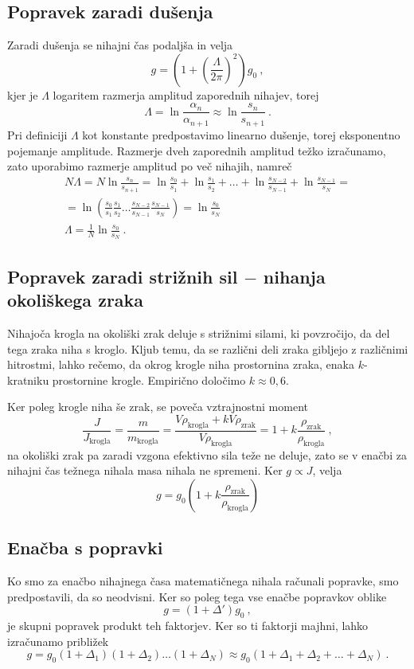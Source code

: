 \documentclass[12pt,a4paper]{article}
\begin{document}
\subsection{Popravek zaradi dušenja}
Zaradi dušenja se nihajni čas podaljša in velja
$$ g = \left( 1 + \left( \frac{\Lambda}{2\pi} \right)^2 \right) g_{0} \>, $$
kjer je $\Lambda$ logaritem razmerja amplitud zaporednih nihajev, torej
$$ \Lambda = \ln \frac{\alpha_n}{\alpha_{n+1}} \approx \ln \frac{s_n}{s_{n+1}} \>. $$
Pri definiciji $\Lambda$ kot konstante predpostavimo linearno dušenje, torej eksponentno pojemanje amplitude. Razmerje dveh zaporednih amplitud težko izračunamo, zato uporabimo razmerje amplitud po več nihajih, namreč
\begin{gather*}
  N\Lambda = N \ln \frac{s_n}{s_{n+1}} = \ln \frac{s_{0}}{s_{1}} + \ln \frac{s_{1}}{s_{2}} + \dots + \ln \frac{s_{N-2}}{s_{N-1}} + \ln \frac{s_{N-1}}{s_{N}} = \\
  = \ln \left( \frac{s_{0}}{s_{1}} \frac{s_{1}}{s_{2}} \dots \frac{s_{N-2}}{s_{N-1}} \frac{s_{N-1}}{s_{N}} \right) = \ln \frac{s_{0}}{s_{N}} \\
  \Lambda = \frac{1}{N} \ln \frac{s_{0}}{s_{N}} \>.
\end{gather*}

\subsection{Popravek zaradi strižnih sil $-$ nihanja okoliškega zraka}
Nihajoča krogla na okoliški zrak deluje s strižnimi silami, ki povzročijo, da del tega zraka niha s kroglo. Kljub temu, da se različni deli zraka gibljejo z različnimi hitrostmi, lahko rečemo, da okrog krogle niha prostornina zraka, enaka $k$-kratniku prostornine krogle. Empirično določimo $k \approx 0,6$.

Ker poleg krogle niha še zrak, se poveča vztrajnostni moment
$$ \frac{J}{J_{\textrm{krogla}}} = \frac{m}{m_{\textrm{krogla}}} = \frac{V\rho_\textrm{krogla} + kV \rho_{\textrm{zrak}}}{V\rho_\textrm{krogla}} = 1 + k \frac{\rho_{\textrm{zrak}}}{\rho_{\textrm{krogla}}} \>, $$
na okoliški zrak pa zaradi vzgona efektivno sila teže ne deluje, zato se v enačbi za nihajni čas težnega nihala masa nihala ne spremeni. Ker $g \propto J$, velja
$$ g = g_{0} \left( 1 + k \frac{\rho_{\textrm{zrak}}}{\rho_{\textrm{krogla}}} \right) $$

\subsection{Enačba s popravki}
Ko smo za enačbo nihajnega časa matematičnega nihala računali popravke, smo predpostavili, da so neodvisni. Ker so poleg tega vse enačbe popravkov oblike
$$ g = \left( 1 + \Delta' \right) g_{0} \>, $$
je skupni popravek produkt teh faktorjev. Ker so ti faktorji majhni, lahko izračunamo približek
$$ g = g_{0} \left( 1 + \Delta_1 \right) \left( 1 + \Delta_2 \right) \dots \left( 1 + \Delta_N \right) \approx g_{0} \left( 1 + \Delta_1 + \Delta_2 + \dots + \Delta_N \right) \>. $$
\end{document}
